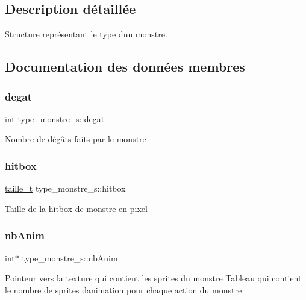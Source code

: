 \subsection{Description détaillée}
Structure représentant le type d\textquotesingle{}un monstre. 

\subsection{Documentation des données membres}
\mbox{\label{structtype__monstre__s_aa3e5568720dc977348e6929f3df5260c}} 
\subsubsection{\texorpdfstring{degat}{degat}}
{\footnotesize\ttfamily int type\+\_\+monstre\+\_\+s\+::degat}

Nombre de dégâts faits par le monstre \mbox{\label{structtype__monstre__s_ac0afaa340c029c12a6939d4b09fd3966}} 
\subsubsection{\texorpdfstring{hitbox}{hitbox}}
{\footnotesize\ttfamily \hyperlink{structtaille__s}{taille\+\_\+t} type\+\_\+monstre\+\_\+s\+::hitbox}

Taille de la hitbox de monstre en pixel \mbox{\label{structtype__monstre__s_aecf18b6fa00e710fe27de2d1b738e62c}} 
\subsubsection{\texorpdfstring{nb\+Anim}{nbAnim}}
{\footnotesize\ttfamily int$\ast$ type\+\_\+monstre\+\_\+s\+::nb\+Anim}

Pointeur vers la texture qui contient les sprites du monstre Tableau qui contient le nombre de sprites d\textquotesingle{}animation pour chaque action du monstre \mbox{\label{structtype__monstre__s_a18520dadfa451022be8dd63b86a1943c}} 
